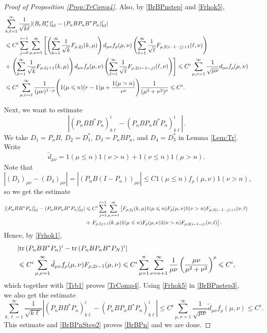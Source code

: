 \documentclass{article}
\numberwithin{equation}{section}
\numberwithin{figure}{section}
\theoremstyle{plain}
\theoremstyle{plain}
\numberwithin{thm}{section}
\theoremstyle{remark}
\newcommand{\Tr}{\text{{\rm tr\,}}}
\let \le \leqslant
\begin{document}
\begin{proof}[Proof of Proposition \ref{Prop:TrComp4}]
Also, by \eqref{BrBPnstep} and \eqref{Frhok5},
\begin{align}\label{BrBPnStep2}
&\sum_{k,\ell=1}^\infty \frac{1}{\sqrt{k\ell}}|(B_rB_r^*)^i_{k\ell}-(P_nBP_nB^*P_n)^i_{k\ell}| \notag\\&\le C^i\sum_{j=0}^{i-1}\sum_{\mu,\nu=1}^\infty\left[\left(\sum_{k=1}^\infty \frac 1{\sqrt{k}}F_{\rho,2j}(k,\mu)\right)d_{\mu\nu}f_\rho(\mu,\nu)\left(\sum_{\ell=1}^\infty \frac 1{\sqrt{\ell}}F_{\rho,2(i-1-j)+1}(\ell,\nu)\right)\right.\notag\\
&+\left.\left(\sum_{k=1}^\infty \frac 1{\sqrt{k}}F_{\rho,2j+1}(k,\mu)\right)d_{\mu\nu}f_\rho(\mu,\nu)\left(\sum_{\ell=1}^\infty \frac 1{\sqrt{\ell}}F_{\rho,2(i-1-j)}(\ell,\nu)\right)\right]
\le C^i\sum_{\mu,\nu=1}^\infty\frac 1{\sqrt{\mu\nu}}d_{\mu\nu}f_\rho(\mu,\nu)\notag\\
&\le C^i\sum_{\mu,\nu=1}^\infty\frac 1{(\mu\nu)^{1-\rho}}\Bigg(1(\mu\le n)(r-1)\mu+\frac{1(\mu>n)}{r^\mu}\Bigg)\frac{1}{(\mu^2+\nu^2)^\rho}\le C^i.
\end{align}

Next, we want to estimate
\begin{equation*}
    |(P_nBB^*P_n)^i_{k\ell}-(P_nBP_nB^*P_n)^i_{k\ell}|.
\end{equation*}
We take $D_1=P_nB$, $D_2=D_1^*$, $D_3=P_nBP_n$, and $D_4=D_3^*$ in Lemma \ref{Lem:Tr}. Write
\begin{equation*}
    \tilde{d}_{\mu\nu}=1(\mu\le n)1(\nu>n)+1(\nu\le n)1(\mu>n).
\end{equation*}
Note that
\begin{equation*}
    |(D_1)_{\mu\nu}-(D_3)_{\mu\nu}|=|(P_nB(I-P_n))_{\mu\nu}|\le C1(\mu\le n)f_\rho(\mu,\nu)1(\nu>n),
\end{equation*}
so we get the estimate
\begin{align}\label{BrBPnstep3}
|(P_nBB^*P_n)^i_{k\ell}-(P_nBP_nB^*P_n)^i_{k\ell}|
&\le C^i\sum_{j=1}^{i-1}\sum_{\mu,\nu=1}^\infty\left[F_{\rho,2j}(k,\mu)1(\mu\le n)F_\rho(\mu,\nu)1(\nu>n)F_{\rho,2(i-1-j)+1}(\nu,\ell)\right.
\notag\\&+
 \left.F_{\rho,2j+1}(k,\mu)1(\mu\le n)F_\rho(\mu,\nu)1(\nu>n)F_{\rho,2(i-1-j)}(\nu,\ell) \right].  
\end{align}
Hence, by \eqref{Frhok1},
\begin{align*}
    &|\Tr(P_nBB^*P_n)^i-\Tr(P_nBP_nB^*P_N)^i|\\
    &\le C^i \sum_{\mu,\nu=1}^\infty\tilde{d}_{\mu\nu}f_{\rho}(\mu,\nu)
    F_{\rho,2i-1}(\mu,\nu)\le C^i\sum_{\mu=1}^n\sum_{\nu=n+1}^\infty \frac 1{\mu\nu}\left(\frac{\mu\nu}{\mu^2+\nu^2}\right)^\rho \le C^i,
\end{align*}
which together with \eqref{Trb1} proves \eqref{TrComp4}. Using \eqref{Frhok5} in \eqref{BrBPnstep3}, we also get the estimate
\begin{equation*}
    \sum_{k,\ell=1}^\infty\frac 1{\sqrt{k\ell}}|(P_nBB^*P_n)^i_{k\ell}-(P_nBP_nB^*P_n)^i_{k\ell}|\le C^i\sum_{\mu,\nu=1}^\infty \frac 1{\sqrt{\mu\nu}}\tilde{d}_{\mu\nu}f_\rho(\mu,\nu)\le C^i.
\end{equation*}
This estimate and \eqref{BrBPnStep2} proves \eqref{BrBPn} and we are done.
\end{proof}
\end{document}
